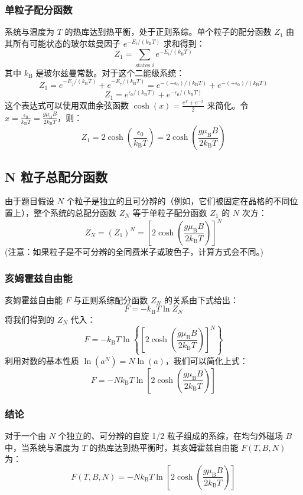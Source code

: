 \documentclass[12pt, a4paper]{article}
\newcommand{\kb}{k_{\mathrm{B}}} %
\newcommand{\mub}{\mu_{\mathrm{B}}} %
\begin{document}
\subsubsection*{单粒子配分函数}
系统与温度为 \(T\) 的热库达到热平衡，处于正则系综。单个粒子的配分函数 \(Z_1\) 由其所有可能状态的玻尔兹曼因子 \(e^{-E_i / (\kb T)}\) 求和得到：
\[
Z_1 = \sum_{\text{states } i} e^{-E_i / (\kb T)}
\]
其中 \(\kb\) 是玻尔兹曼常数。对于这个二能级系统：
\[
Z_1 = e^{-E_\downarrow / (\kb T)} + e^{-E_\uparrow / (\kb T)} = e^{-(-\epsilon_0) / (\kb T)} + e^{-(+\epsilon_0) / (\kb T)}
\]
\[
Z_1 = e^{\epsilon_0 / (\kb T)} + e^{-\epsilon_0 / (\kb T)}
\]
这个表达式可以使用双曲余弦函数 \(\cosh(x) = \frac{e^x + e^{-x}}{2}\) 来简化。令 \(x = \frac{\epsilon_0}{\kb T} = \frac{g \mub B}{2 \kb T}\)，则：
\[
Z_1 = 2 \cosh\left(\frac{\epsilon_0}{\kb T}\right) = 2 \cosh\left(\frac{g \mub B}{2 \kb T}\right)
\]
\subsection*{N 粒子总配分函数}
由于题目假设 \(N\) 个粒子是独立的且可分辨的（例如，它们被固定在晶格的不同位置上），整个系统的总配分函数 \(Z_N\) 等于单粒子配分函数 \(Z_1\) 的 \(N\) 次方：
\[
Z_N = (Z_1)^N = \left[ 2 \cosh\left(\frac{g \mub B}{2 \kb T}\right) \right]^N
\]
(注意：如果粒子是不可分辨的全同费米子或玻色子，计算方式会不同。)
\subsubsection*{亥姆霍兹自由能}
亥姆霍兹自由能 \(F\) 与正则系综配分函数 \(Z_N\) 的关系由下式给出：
\[
F = -\kb T \ln Z_N
\]
将我们得到的 \(Z_N\) 代入：
\[
F = -\kb T \ln \left\{ \left[ 2 \cosh\left(\frac{g \mub B}{2 \kb T}\right) \right]^N \right\}
\]
利用对数的基本性质 \(\ln(a^N) = N \ln(a)\)，我们可以简化上式：
\[
F = -N \kb T \ln \left[ 2 \cosh\left(\frac{g \mub B}{2 \kb T}\right) \right]
\]
\subsubsection*{结论}
对于一个由 \(N\) 个独立的、可分辨的自旋 1/2 粒子组成的系综，在均匀外磁场 \(B\) 中，当系统与温度为 \(T\) 的热库达到热平衡时，其亥姆霍兹自由能 \(F(T, B, N)\) 为：
\[
F(T, B, N) = -N \kb T \ln \left[ 2 \cosh\left(\frac{g \mub B}{2 \kb T}\right) \right]
\]
\end{document}
